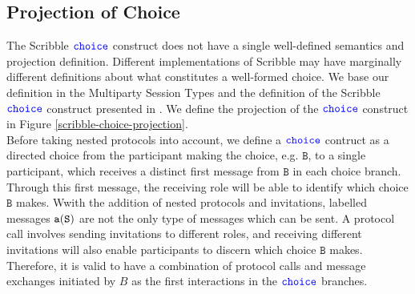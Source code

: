 \documentclass[12pt,twoside]{report}
\begin{document}


 


\subsection{Projection of Choice}\label{scr-choice-projection}

The Scribble ${\color{blue}\mathtt{choice}}$ construct does not have a single well-defined semantics and projection definition. Different implementations of Scribble may have marginally different definitions about what constitutes a well-formed choice.  We base our definition in the Multiparty Session Types\cite{gentleintrotompst} and the definition of the Scribble ${\color{blue}\mathtt{choice}}$ construct presented in \cite{featherweight}. We define the projection of the ${\color{blue}\mathtt{choice}}$ construct in Figure \ref{scribble-choice-projection}.\\


Before taking nested protocols into account, we define a ${\color{blue}\mathtt{choice}}$ contruct as a directed choice from the participant making the choice, e.g. $\mathtt{B}$, to a single participant, which receives a distinct first message from $\mathtt{B}$ in each choice branch. Through this first message, the receiving role will be able to identify which choice $\mathtt{B}$ makes. Wwith the addition of nested protocols and invitations, labelled messages $\mathtt{a}(\mathtt{S})$ are not the only type of messages which can be sent. A protocol call involves sending invitations to different roles, and receiving different invitations will also enable participants to discern which choice $\mathtt{B}$ makes. Therefore, it is valid to have a combination of protocol calls and message exchanges initiated by $B$ as the first interactions in the ${\color{blue}\mathtt{choice}}$ branches.\\
\end{document}
